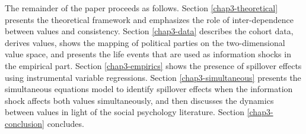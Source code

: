 The remainder of the paper proceeds as follows. Section \ref{chap3-theoretical} presents the theoretical framework and emphasizes the role of inter-dependence between values and consistency. Section \ref{chap3-data} describes the cohort data, derives values, shows the mapping of political parties on the two-dimensional value space, and presents the life events that are used as information shocks in the empirical part. Section \ref{chap3-empirics} shows the presence of spillover effects using instrumental variable regressions. Section \ref{chap3-simultaneous} presents the simultaneous equations model to identify spillover effects when the information shock affects both values simultaneously, and then discusses the dynamics between values in light of the social psychology literature. Section \ref{chap3-conclusion} concludes.
